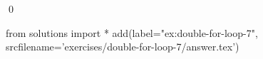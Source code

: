 
    \begin{ex}
  \label{ex:double-for-loop-7}
  
  \qed
\end{ex}
\begin{python0}
from solutions import *
add(label="ex:double-for-loop-7",
    srcfilename='exercises/double-for-loop-7/answer.tex') 
\end{python0}                              
